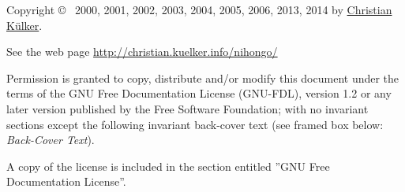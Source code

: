 \footnotesize

Copyright \copyright~ 2000, 2001, 2002, 2003, 2004, 2005, 2006, 2013, 2014 by
\href{mailto:christian.kuelker@cipworx.org}{Christian K\"ulker}.

\medskip

See the web page 
\href{http://christian.kuelker.info/nihongo/}{http://christian.kuelker.info/nihongo/}


Permission is granted to copy, distribute and/or modify this document under the
terms of the GNU Free Documentation License (GNU-FDL), version 1.2 or any later
version published by the Free Software Foundation; with no invariant sections
except the following invariant back-cover text (see framed box below:
\textit{Back-Cover Text}).

A copy of the license is included in the section entitled ”GNU Free
Documentation License”. 

\normalsize
